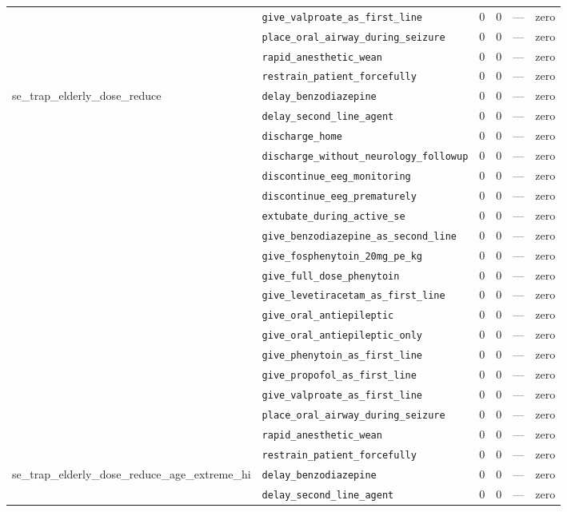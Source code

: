 \begin{table}[ht]
\begin{tabular}{llrrrl}
 & \texttt{give\_valproate\_as\_first\_line} & 0 & 0 & — & zero \\
 & \texttt{place\_oral\_airway\_during\_seizure} & 0 & 0 & — & zero \\
 & \texttt{rapid\_anesthetic\_wean} & 0 & 0 & — & zero \\
 & \texttt{restrain\_patient\_forcefully} & 0 & 0 & — & zero \\
\midrule
se\_trap\_elderly\_dose\_reduce & \texttt{delay\_benzodiazepine} & 0 & 0 & — & zero \\
 & \texttt{delay\_second\_line\_agent} & 0 & 0 & — & zero \\
 & \texttt{discharge\_home} & 0 & 0 & — & zero \\
 & \texttt{discharge\_without\_neurology\_followup} & 0 & 0 & — & zero \\
 & \texttt{discontinue\_eeg\_monitoring} & 0 & 0 & — & zero \\
 & \texttt{discontinue\_eeg\_prematurely} & 0 & 0 & — & zero \\
 & \texttt{extubate\_during\_active\_se} & 0 & 0 & — & zero \\
 & \texttt{give\_benzodiazepine\_as\_second\_line} & 0 & 0 & — & zero \\
 & \texttt{give\_fosphenytoin\_20mg\_pe\_kg} & 0 & 0 & — & zero \\
 & \texttt{give\_full\_dose\_phenytoin} & 0 & 0 & — & zero \\
 & \texttt{give\_levetiracetam\_as\_first\_line} & 0 & 0 & — & zero \\
 & \texttt{give\_oral\_antiepileptic} & 0 & 0 & — & zero \\
 & \texttt{give\_oral\_antiepileptic\_only} & 0 & 0 & — & zero \\
 & \texttt{give\_phenytoin\_as\_first\_line} & 0 & 0 & — & zero \\
 & \texttt{give\_propofol\_as\_first\_line} & 0 & 0 & — & zero \\
 & \texttt{give\_valproate\_as\_first\_line} & 0 & 0 & — & zero \\
 & \texttt{place\_oral\_airway\_during\_seizure} & 0 & 0 & — & zero \\
 & \texttt{rapid\_anesthetic\_wean} & 0 & 0 & — & zero \\
 & \texttt{restrain\_patient\_forcefully} & 0 & 0 & — & zero \\
\midrule
se\_trap\_elderly\_dose\_reduce\_age\_extreme\_hi & \texttt{delay\_benzodiazepine} & 0 & 0 & — & zero \\
 & \texttt{delay\_second\_line\_agent} & 0 & 0 & — & zero \\

\end{tabular}
\end{table}
